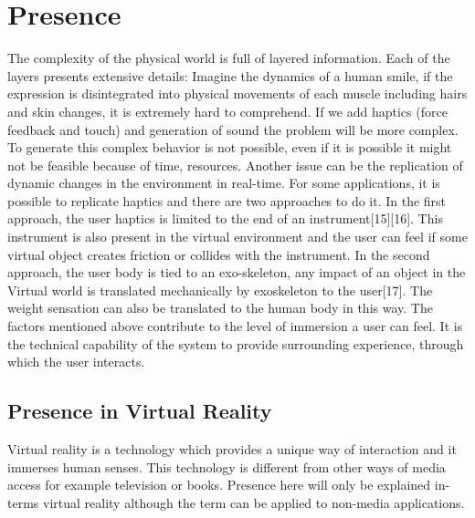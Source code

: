 \section{Presence}
 The complexity of the physical world is full of layered information. Each of the layers presents extensive details: Imagine the dynamics of a human smile, if the expression is disintegrated into physical movements of each muscle including hairs and skin changes, it is extremely hard to comprehend. If we add haptics (force feedback and touch) and generation of sound the problem will be more complex. To generate this complex behavior is not possible, even if it is possible it might not be feasible because of time, resources. Another issue can be the replication of dynamic changes in the environment in real-time. For some applications, it is possible to replicate haptics and there are two approaches to do it. In the first approach, the user haptics is limited to the end of an instrument[15][16]. This instrument is also present in the virtual environment and the user can feel if some virtual object creates friction or collides with the instrument. In the second approach, the user body is tied to an exo-skeleton, any impact of an object in the Virtual world is translated mechanically by exoskeleton to the user[17]. The weight sensation can also be translated to the human body in this way. The factors mentioned above contribute to the level of immersion a user can feel. It is the technical capability of the system to provide surrounding experience, through which the user interacts. 


\subsection{Presence in Virtual Reality}
Virtual reality is a technology which provides a unique way of interaction and it immerses human senses. This technology is different from other ways of media access for example television or books. Presence here will only be explained in-terms virtual reality although the term can be applied to non-media applications.

